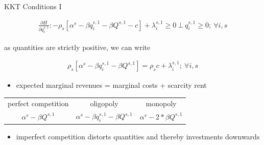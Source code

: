 \begin{frame}{KKT Conditions I}


\begin{gather}
\frac{\partial H}{ \partial q_{i}^{s,1}}: - \rho_s \left[ \alpha^s - \beta q_{i}^{s,1} - \beta Q^{s,1} - c \right] + \lambda_{i}^{s,1} \geq 0 \ \bot \ q_{i}^{s,1} \geq 0;\ \forall i,s \label{eq:foc1a}
\end{gather}

as quantities are strictly positive, we can write

\begin{gather}
 \rho_s \left[ \alpha^s - \beta q_{i}^{s,1} - \beta Q^{s,1}\right]=  \rho_s c  + \lambda_{i}^{s,1} ;\ \forall i,s    \label{eq:foc1b}
\end{gather}

\begin{itemize}
	\item expected marginal revenues = marginal costs + scarcity rent
\end{itemize}

\begin{tabular}{ccc}
 \hline
perfect competition & oligopoly &  monopoly \\
$\alpha^s - \beta Q^{s,1}$ &  $\alpha^s - \beta q_{i}^{s,1} - \beta Q^{s,1}$    & $\alpha^s - 2* \beta Q^{s,1}$  \\
 \hline
\end{tabular}

\begin{itemize}
	\item imperfect competition distorts quantities and thereby investments downwards
\end{itemize}

\end{frame}

